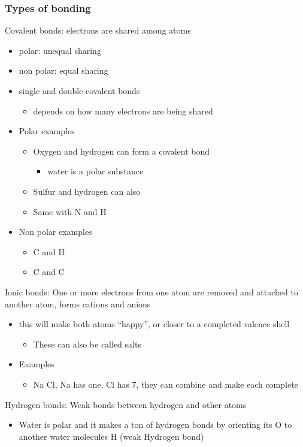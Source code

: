 \documentclass[11pt]{article}
\begin{document}
\subsubsection{Types of bonding}
\label{sec:orgae09e10}
Covalent bonds: electrons are shared among atoms
\begin{itemize}
\item polar: unequal sharing
\item non polar: equal sharing
\item single and double covalent bonds
\begin{itemize}
\item depends on how many electrons are being shared
\end{itemize}
\item Polar examples
\begin{itemize}
\item Oxygen and hydrogen can form a covalent bond
\begin{itemize}
\item water is a polar substance
\end{itemize}
\item Sulfur and hydrogen can also
\item Same with N and H
\end{itemize}
\item Non polar examples
\begin{itemize}
\item C and H
\item C and C
\end{itemize}
\end{itemize}
Ionic bonds: One or more electrons from one atom are removed and attached to another atom, forms cations and anions
\begin{itemize}
\item this will make both atoms ``happy'', or closer to a completed valence shell
\begin{itemize}
\item These can also be called salts
\end{itemize}
\item Examples
\begin{itemize}
\item Na Cl, Na has one, Cl has 7, they can combine and make each complete
\end{itemize}
\end{itemize}
Hydrogen bonds: Weak bonds between hydrogen and other atoms
\begin{itemize}
\item Water is polar and it makes a ton of hydrogen bonds by orienting its O to another water molecules H (weak Hydrogen bond)
\end{itemize}
\end{document}

